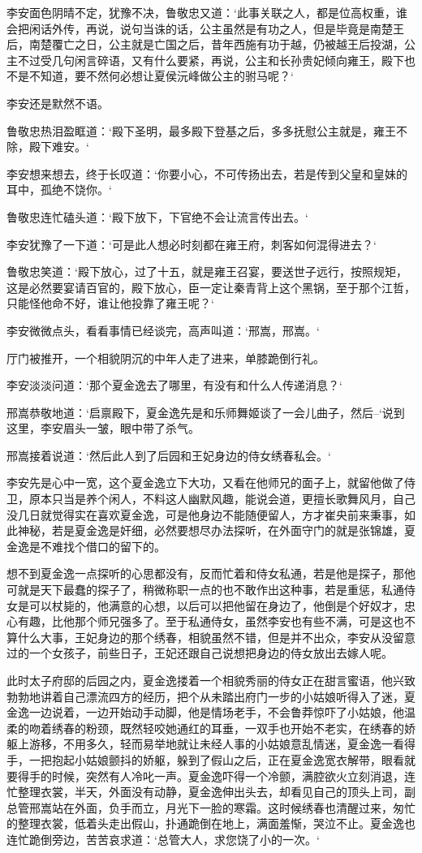 李安面色阴晴不定，犹豫不决，鲁敬忠又道：‘此事关联之人，都是位高权重，谁会把闲话外传，再说，说句当诛的话，公主虽然是有功之人，但是毕竟是南楚王后，南楚覆亡之日，公主就是亡国之后，昔年西施有功于越，仍被越王后投湖，公主不过受几句闲言碎语，又有什么要紧，再说，公主和长孙贵妃倾向雍王，殿下也不是不知道，要不然何必想让夏侯沅峰做公主的驸马呢？‘

李安还是默然不语。

鲁敬忠热泪盈眶道：‘殿下圣明，最多殿下登基之后，多多抚慰公主就是，雍王不除，殿下难安。‘

李安想来想去，终于长叹道：‘你要小心，不可传扬出去，若是传到父皇和皇妹的耳中，孤绝不饶你。‘

鲁敬忠连忙磕头道：‘殿下放下，下官绝不会让流言传出去。‘

李安犹豫了一下道：‘可是此人想必时刻都在雍王府，刺客如何混得进去？‘

鲁敬忠笑道：‘殿下放心，过了十五，就是雍王召宴，要送世子远行，按照规矩，这是必然要宴请百官的，殿下放心，臣一定让秦青背上这个黑锅，至于那个江哲，只能怪他命不好，谁让他投靠了雍王呢？‘

李安微微点头，看看事情已经谈完，高声叫道：‘邢嵩，邢嵩。‘

厅门被推开，一个相貌阴沉的中年人走了进来，单膝跪倒行礼。

李安淡淡问道：‘那个夏金逸去了哪里，有没有和什么人传递消息？‘

邢嵩恭敬地道：‘启禀殿下，夏金逸先是和乐师舞姬谈了一会儿曲子，然后--‘说到这里，李安眉头一皱，眼中带了杀气。

邢嵩接着说道：‘然后此人到了后园和王妃身边的侍女绣春私会。‘

李安先是心中一宽，这个夏金逸立下大功，又看在他师兄的面子上，就留他做了侍卫，原本只当是养个闲人，不料这人幽默风趣，能说会道，更擅长歌舞风月，自己没几日就觉得实在喜欢夏金逸，可是他身边不能随便留人，方才崔央前来秉事，如此神秘，若是夏金逸是奸细，必然要想尽办法探听，在外面守门的就是张锦雄，夏金逸是不难找个借口的留下的。

想不到夏金逸一点探听的心思都没有，反而忙着和侍女私通，若是他是探子，那他可就是天下最蠢的探子了，稍微称职一点的也不敢作出这种事，若是重惩，私通侍女是可以杖毙的，他满意的心想，以后可以把他留在身边了，他倒是个好奴才，忠心有趣，比他那个师兄强多了。至于私通侍女，虽然李安也有些不满，可是这也不算什么大事，王妃身边的那个绣春，相貌虽然不错，但是并不出众，李安从没留意过的一个女孩子，前些日子，王妃还跟自己说想把身边的侍女放出去嫁人呢。

此时太子府邸的后园之内，夏金逸搂着一个相貌秀丽的侍女正在甜言蜜语，他兴致勃勃地讲着自己漂流四方的经历，把个从未踏出府门一步的小姑娘听得入了迷，夏金逸一边说着，一边开始动手动脚，他是情场老手，不会鲁莽惊吓了小姑娘，他温柔的吻着绣春的粉颈，既然轻咬她通红的耳垂，一双手也开始不老实，在绣春的娇躯上游移，不用多久，轻而易举地就让未经人事的小姑娘意乱情迷，夏金逸一看得手，一把抱起小姑娘颤抖的娇躯，躲到了假山之后，正在夏金逸宽衣解带，眼看就要得手的时候，突然有人冷叱一声。夏金逸吓得一个冷颤，满腔欲火立刻消退，连忙整理衣裳，半天，外面没有动静，夏金逸伸出头去，却看见自己的顶头上司，副总管邢嵩站在外面，负手而立，月光下一脸的寒霜。这时候绣春也清醒过来，匆忙的整理衣裳，低着头走出假山，扑通跪倒在地上，满面羞惭，哭泣不止。夏金逸也连忙跪倒旁边，苦苦哀求道：‘总管大人，求您饶了小的一次。‘

